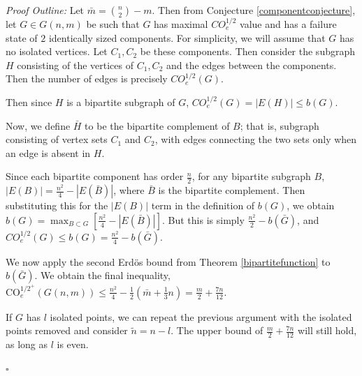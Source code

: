 \documentclass[12pt]{article}
\theoremstyle{definition}
\newenvironment{proofoutline}{\noindent\emph{Proof Outline:}}{\hfill$\square$}
\newcommand{\COE}[2]{CO^{#1}_{e}(#2)}
\begin{document}
%
\begin{proofoutline}
Let $\bar{m}={n \choose 2} - m$. Then from Conjecture \ref{componentconjecture}, let $G\in G(n,m)$ be such that $G$ has maximal $CO^{1/2}_e$ value and has a failure state of $2$ identically sized components. For simplicity, we will assume that $G$ has no isolated vertices. Let $C_1,C_2$ be these components. Then consider the subgraph $H$ consisting of the vertices of $C_1,C_2$ and the edges between the components. Then the number of edges is precisely $\COE{1/2}{G}$. 


Then since $H$ is a bipartite subgraph of $G$, $\COE{1/2}{G}=|E(H)|\le b(G)$. 

Now, we define $\bar{H}$ to be the bipartite complement of $B$; that is, subgraph consisting of vertex sets $C_1$ and $C_2$, with edges connecting the two sets only when an edge is absent in $H$. 




Since each bipartite component has order $\frac{n}{2}$, for any bipartite subgraph $B$,\\ $|E(B)|=\frac{n^2}{4}-|E(\bar{B})|$, where $\bar{B}$ is the bipartite complement. Then substituting this for the $|E(B)|$ term in the definition of $b(G)$, we obtain $b(G) = \max_{B\subset G}\left[ \frac{n^2}{4}- \left|E(\bar{B}) \right| \right]$. But this is simply $\frac{n^2}{2}-b(\bar{G})$, and $\COE{1/2}{G}\le b(G) = \frac{n^2}{4}-b(\bar{G})$.


We now apply the second Erd\"os bound from Theorem \ref{bipartitefunction} to $b(\bar{G})$. We obtain the final inequality, $\text{CO}_{e}^{1/2^+}{(G(n,m))}\le \frac{n^2}{4}-\frac{1}{2}(\bar{m} + \frac{1}{3}n)=\frac{m}{2}+\frac{7n}{12}.$ 

If $G$ has $l$ isolated points, we can repeat the previous argument with the isolated points removed and consider $\tilde{n} = n-l$. The upper bound of $\frac{m}{2} + \frac{7n}{12}$ will still hold, as long as $l$ is even. 



\end{proofoutline}
\end{document}
